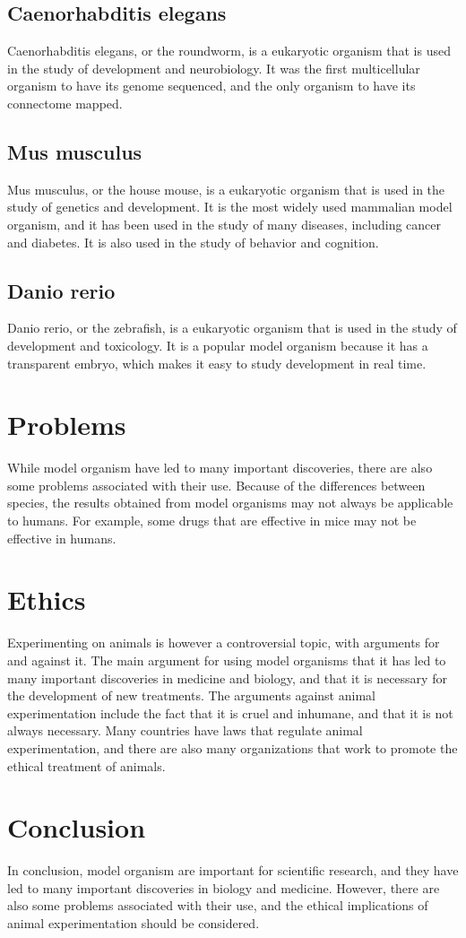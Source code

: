 \documentclass{article}
\begin{document}
\subsection{Caenorhabditis elegans}
Caenorhabditis elegans, or the roundworm, is a eukaryotic organism that is used in the study of development and neurobiology. It was the first multicellular organism to have its genome sequenced, and the only organism to have its connectome mapped. 
\subsection{Mus musculus}
Mus musculus, or the house mouse, is a eukaryotic organism that is used in the study of genetics and development. It is the most widely used mammalian model organism, and it has been used in the study of many diseases, including cancer and diabetes. It is also used in the study of behavior and cognition.
\subsection{Danio rerio}
Danio rerio, or the zebrafish, is a eukaryotic organism that is used in the study of development and toxicology. It is a popular model organism because it has a transparent embryo, which makes it easy to study development in real time.

\section{Problems}
While model organism have led to many important discoveries, there are also some problems associated with their use. Because of the differences between species, the results obtained from model organisms may not always be applicable to humans. For example, some drugs that are effective in mice may not be effective in humans. 

\section{Ethics}
Experimenting on animals is however a controversial topic, with arguments for and against it. The main argument for using model organisms that it has led to many important discoveries in medicine and biology, and that it is necessary for the development of new treatments. The arguments against animal experimentation include the fact that it is cruel and inhumane, and that it is not always necessary. Many countries have laws that regulate animal experimentation, and there are also many organizations that work to promote the ethical treatment of animals.

\section{Conclusion}
In conclusion, model organism are important for scientific research, and they have led to many important discoveries in biology and medicine. However, there are also some problems associated with their use, and the ethical implications of animal experimentation should be considered.
\end{document}
